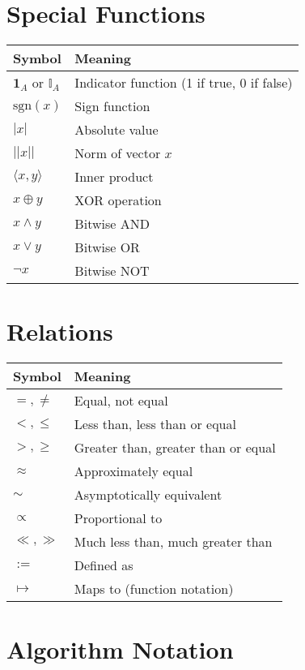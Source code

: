 \section{Special Functions}

\begin{center}
\begin{tabular}{|l|l|}
\hline
\textbf{Symbol} & \textbf{Meaning} \\
\hline
$\mathbf{1}_A$ or $\mathbb{I}_A$ & Indicator function (1 if true, 0 if false) \\
$\text{sgn}(x)$ & Sign function \\
$|x|$ & Absolute value \\
$||x||$ & Norm of vector $x$ \\
$\langle x, y \rangle$ & Inner product \\
$x \oplus y$ & XOR operation \\
$x \land y$ & Bitwise AND \\
$x \lor y$ & Bitwise OR \\
$\neg x$ & Bitwise NOT \\
\hline
\end{tabular}
\end{center}

\section{Relations}

\begin{center}
\begin{tabular}{|l|l|}
\hline
\textbf{Symbol} & \textbf{Meaning} \\
\hline
$=, \neq$ & Equal, not equal \\
$<, \leq$ & Less than, less than or equal \\
$>, \geq$ & Greater than, greater than or equal \\
$\approx$ & Approximately equal \\
$\sim$ & Asymptotically equivalent \\
$\propto$ & Proportional to \\
$\ll, \gg$ & Much less than, much greater than \\
$:=$ & Defined as \\
$\mapsto$ & Maps to (function notation) \\
\hline
\end{tabular}
\end{center}

\section{Algorithm Notation}

